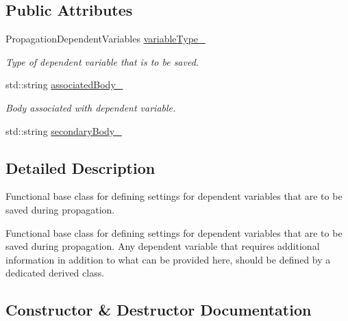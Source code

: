 \subsection*{Public Attributes}
\begin{DoxyCompactItemize}
\item 
Propagation\+Dependent\+Variables \hyperlink{classtudat_1_1propagators_1_1SingleDependentVariableSaveSettings_a5741e1816850ecd66dde134d26ecfeae}{variable\+Type\+\_\+}\hypertarget{classtudat_1_1propagators_1_1SingleDependentVariableSaveSettings_a5741e1816850ecd66dde134d26ecfeae}{}\label{classtudat_1_1propagators_1_1SingleDependentVariableSaveSettings_a5741e1816850ecd66dde134d26ecfeae}

\begin{DoxyCompactList}\small\item\em Type of dependent variable that is to be saved. \end{DoxyCompactList}\item 
std\+::string \hyperlink{classtudat_1_1propagators_1_1SingleDependentVariableSaveSettings_a75122aa26880a97151b0caa4cc54f786}{associated\+Body\+\_\+}\hypertarget{classtudat_1_1propagators_1_1SingleDependentVariableSaveSettings_a75122aa26880a97151b0caa4cc54f786}{}\label{classtudat_1_1propagators_1_1SingleDependentVariableSaveSettings_a75122aa26880a97151b0caa4cc54f786}

\begin{DoxyCompactList}\small\item\em Body associated with dependent variable. \end{DoxyCompactList}\item 
std\+::string \hyperlink{classtudat_1_1propagators_1_1SingleDependentVariableSaveSettings_ae753de13467b2d1b065651f3ba7c0633}{secondary\+Body\+\_\+}
\end{DoxyCompactItemize}


\subsection{Detailed Description}
Functional base class for defining settings for dependent variables that are to be saved during propagation. 

Functional base class for defining settings for dependent variables that are to be saved during propagation. Any dependent variable that requires additional information in addition to what can be provided here, should be defined by a dedicated derived class. 

\subsection{Constructor \& Destructor Documentation}
